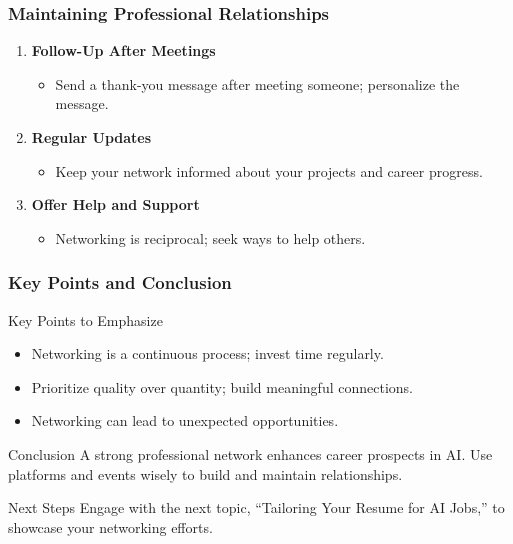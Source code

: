 \documentclass{beamer}
\begin{document}
\begin{frame}[fragile]
    \frametitle{Maintaining Professional Relationships}

    \begin{enumerate}
        \item \textbf{Follow-Up After Meetings}
            \begin{itemize}
                \item Send a thank-you message after meeting someone; personalize the message.
            \end{itemize}

        \item \textbf{Regular Updates}
            \begin{itemize}
                \item Keep your network informed about your projects and career progress.
            \end{itemize}

        \item \textbf{Offer Help and Support}
            \begin{itemize}
                \item Networking is reciprocal; seek ways to help others.
            \end{itemize}
    \end{enumerate}
\end{frame}

\begin{frame}[fragile]
    \frametitle{Key Points and Conclusion}

    \begin{block}{Key Points to Emphasize}
        \begin{itemize}
            \item Networking is a continuous process; invest time regularly.
            \item Prioritize quality over quantity; build meaningful connections.
            \item Networking can lead to unexpected opportunities.
        \end{itemize}
    \end{block}

    \begin{block}{Conclusion}
        A strong professional network enhances career prospects in AI. 
        Use platforms and events wisely to build and maintain relationships.
    \end{block}

    \begin{block}{Next Steps}
        Engage with the next topic, ``Tailoring Your Resume for AI Jobs,'' to showcase your networking efforts.
    \end{block}
\end{frame}
\end{document}
